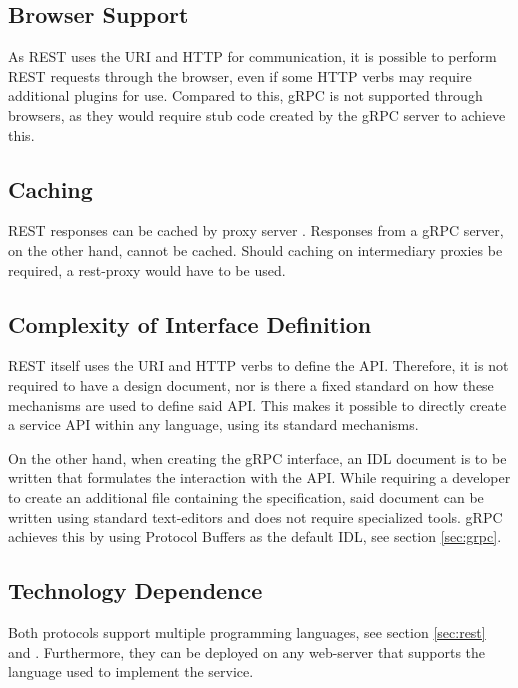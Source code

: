 \documentclass[conference]{IEEEtran}
\begin{document}
\subsection{Browser Support}

As REST uses the URI and HTTP for communication, it is possible to perform REST requests through the browser, even if some HTTP verbs may require additional plugins for use. Compared to this, gRPC is not supported through browsers, as they would require stub code created by the gRPC server to achieve this.

\subsection{Caching}

REST responses can be cached by proxy server \cite{wagh2012comparative}. Responses from a gRPC server, on the other hand, cannot be cached. Should caching on intermediary proxies be required, a rest-proxy would have to be used.

\subsection{Complexity of Interface Definition}

REST itself uses the URI and HTTP verbs to define the API. Therefore, it is not required to have a design document, nor is there a fixed standard on how these mechanisms are used to define said API. This makes it possible to directly create a service API within any language, using its standard mechanisms.

On the other hand, when creating the gRPC interface, an IDL document is to be written that formulates the interaction with the API. While requiring a developer to create an additional file containing the specification, said document can be written using standard text-editors and does not require specialized tools. gRPC achieves this by using Protocol Buffers as the default IDL, see section \ref{sec:grpc}.

\subsection{Technology Dependence}

Both protocols support multiple programming languages, see section \ref{sec:rest} and \cite{grpcmotiviation}. Furthermore, they can be deployed on any web-server that supports the language used to implement the service.
\end{document}
